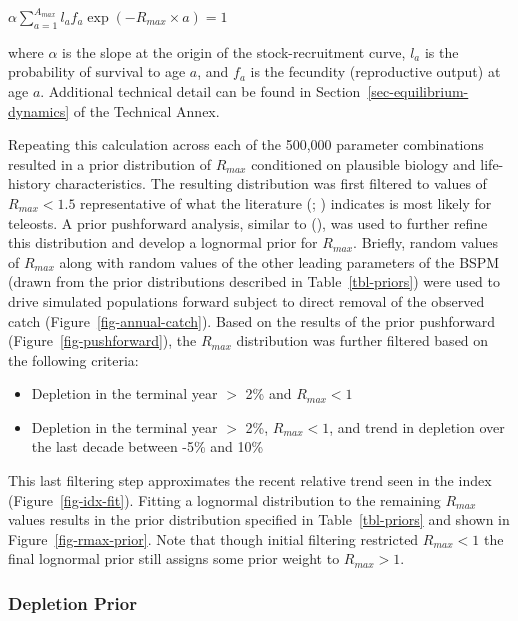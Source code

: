 \documentclass[
  11pt,
]{SCreport}
\providecommand{\tightlist}{%
  \setlength{\itemsep}{0pt}\setlength{\parskip}{0pt}}\usepackage{longtable,booktabs,array}
\begin{document}
\(\alpha \sum_{a=1}^{A_{max}} l_a f_a \exp(-R_{max} \times a) = 1\)

where \(\alpha\) is the slope at the origin of the stock-recruitment
curve, \(l_a\) is the probability of survival to age \(a\), and \(f_a\)
is the fecundity (reproductive output) at age \(a\). Additional
technical detail can be found in Section~\ref{sec-equilibrium-dynamics}
of the Technical Annex.

Repeating this calculation across each of the 500,000 parameter
combinations resulted in a prior distribution of \(R_{max}\) conditioned
on plausible biology and life-history characteristics. The resulting
distribution was first filtered to values of \(R_{max} < 1.5\)
representative of what the literature
(;
)
indicates is most likely for teleosts. A prior pushforward analysis,
similar to (), was used to
further refine this distribution and develop a lognormal prior for
\(R_{max}\). Briefly, random values of \(R_{max}\) along with random
values of the other leading parameters of the BSPM (drawn from the prior
distributions described in Table~\ref{tbl-priors}) were used to drive
simulated populations forward subject to direct removal of the observed
catch (Figure~\ref{fig-annual-catch}). Based on the results of the prior
pushforward (Figure~\ref{fig-pushforward}), the \(R_{max}\) distribution
was further filtered based on the following criteria:

\begin{itemize}
\tightlist
\item
  Depletion in the terminal year \(>\) 2\% and \(R_{max} < 1\)
\item
  Depletion in the terminal year \(>\) 2\%, \(R_{max} < 1\), and trend
  in depletion over the last decade between -5\% and 10\%
\end{itemize}

This last filtering step approximates the recent relative trend seen in
the index (Figure~\ref{fig-idx-fit}). Fitting a lognormal distribution
to the remaining \(R_{max}\) values results in the prior distribution
specified in Table~\ref{tbl-priors} and shown in
Figure~\ref{fig-rmax-prior}. Note that though initial filtering
restricted \(R_{max}<1\) the final lognormal prior still assigns some
prior weight to \(R_{max}>1\).

\subsubsection{Depletion Prior}\label{sec-depletion-prior}
\end{document}
